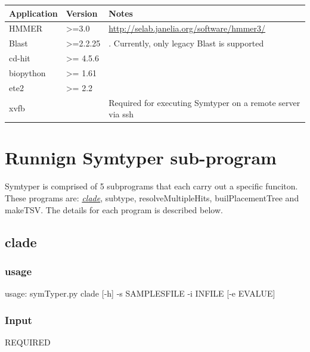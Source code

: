 \documentclass[letterpaper,10pt,english]{sphinxmanual}
\begin{document}
\begin{tabulary}{\linewidth}{|L|L|L|}
\hline
\textsf{\relax 
Application
} & \textsf{\relax 
Version
} & \textsf{\relax 
Notes
}\\
\hline
HMMER
 & 
\textgreater{}=3.0
 & 
\href{http://selab.janelia.org/software/hmmer3/}{http://selab.janelia.org/software/hmmer3/}
\\

Blast
 & 
\textgreater{}=2.2.25
 & 
. Currently, only legacy Blast is supported
\\

cd-hit
 & 
\textgreater{}= 4.5.6
 & \\

biopython
 & 
\textgreater{}= 1.61
 & \\

ete2
 & 
\textgreater{}= 2.2
 & \\

xvfb
 &  & 
Required for executing Symtyper on a remote server via ssh
\\
\hline\end{tabulary}



\section{Runnign Symtyper sub-program}
\label{CommandLine:runnign-symtyper-sub-program}
Symtyper is comprised of 5 subprograms that each carry out a specific funciton.
These programs are: {\hyperref[CommandLine:clade]{\emph{clade}}}, subtype, resolveMultipleHits, builPlacementTree and makeTSV.
The details for each program is described below.


\subsection{clade}
\label{CommandLine:clade}\label{CommandLine:id1}

\subsubsection{usage}
\label{CommandLine:usage}
usage: symTyper.py clade {[}-h{]} -s SAMPLESFILE -i INFILE {[}-e EVALUE{]}


\subsubsection{Input}
\label{CommandLine:input}
REQUIRED
\end{document}
